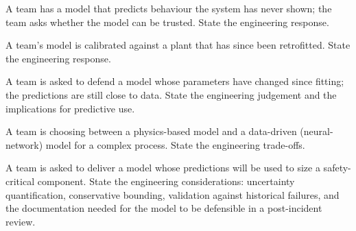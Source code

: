 \begin{exercise}
A team has a model that predicts behaviour the system has never shown; the team asks whether the model can be trusted. State the engineering response.
\end{exercise}

\begin{exercise}
A team's model is calibrated against a plant that has since been retrofitted. State the engineering response.
\end{exercise}

\begin{exercise}
A team is asked to defend a model whose parameters have changed since fitting; the predictions are still close to data. State the engineering judgement and the implications for predictive use.
\end{exercise}

\begin{exercise}
A team is choosing between a physics-based model and a data-driven (neural-network) model for a complex process. State the engineering trade-offs.
\end{exercise}

\begin{exercise}
A team is asked to deliver a model whose predictions will be used to size a safety-critical component. State the engineering considerations: uncertainty quantification, conservative bounding, validation against historical failures, and the documentation needed for the model to be defensible in a post-incident review.
\end{exercise}
